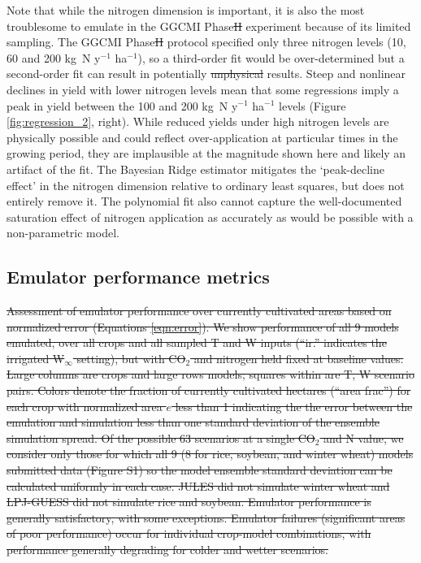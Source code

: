 \documentclass[gmdd]{copernicus} %
\providecommand{\DIFadd}[1]{{\protect\color{blue}\uwave{#1}}} %
\providecommand{\DIFdel}[1]{{\protect\color{red}\sout{#1}}}                      %
\providecommand{\DIFaddbegin}{} %
\providecommand{\DIFaddend}{} %
\providecommand{\DIFdelbegin}{} %
\providecommand{\DIFdelend}{} %
\providecommand{\DIFdelFL}[1]{\DIFdel{#1}} %
\begin{document}
Note that while the nitrogen dimension is important, it is also the most troublesome to emulate in the GGCMI Phase\DIFdelbegin \DIFdel{II }\DIFdelend \DIFaddbegin \DIFadd{~2 }\DIFaddend experiment because of its limited sampling. 
The GGCMI Phase\DIFdelbegin \DIFdel{II }\DIFdelend \DIFaddbegin \DIFadd{~2 }\DIFaddend protocol specified only three nitrogen levels (10, 60 and 200 kg~N y$^{-1}$ ha$^{-1}$), so a third-order fit would be over-determined but a second-order fit can result in potentially \DIFdelbegin \DIFdel{unphysical }\DIFdelend \DIFaddbegin \DIFadd{non-physical }\DIFaddend results. 
Steep and nonlinear declines in yield with lower nitrogen levels mean that some regressions imply a peak in yield between the 100 and 200 kg~N y$^{-1}$ ha$^{-1}$ levels (Figure \ref{fig:regression_2}, right). 
While reduced yields under high nitrogen levels are physically possible and could reflect over-application at particular times in the growing period, they are implausible at the magnitude shown here and likely an artifact of the fit. 
The Bayesian Ridge estimator mitigates the `peak-decline effect' in the nitrogen dimension relative to ordinary least squares, but does not entirely remove it. 
The polynomial fit also cannot capture the well-documented saturation effect of nitrogen application \citep[e.g.][]{Torsten77} as accurately as would be possible with a non-parametric model. 

\subsection{Emulator performance metrics}
\label{S:4.2}
\DIFdelbegin %
{%
\DIFdelFL{Assessment of emulator performance over currently cultivated areas based on normalized error (Equations \ref{eqn:error}). 
    We show performance of all 9 models emulated, over all crops and all sampled T and W inputs (``ir.'' indicates the irrigated W$_{\infty}$ setting), but with CO$_2$ and nitrogen held fixed at baseline values. 
    Large columns are crops and large rows models; squares within are T, W scenario pairs. 
    Colors denote the fraction of currently cultivated hectares (``area frac'') for each crop with normalized area $e$ less than 1 indicating the the error between the emulation and simulation less than one standard deviation of the ensemble simulation spread. 
    Of the possible 63 scenarios at a single CO$_2$ and N value, we consider only those for which all 9 (8 for rice, soybean, and winter wheat) models submitted data (Figure S1) so the model ensemble standard deviation can be calculated uniformly in each case. 
    JULES did not simulate winter wheat and LPJ-GUESS did not simulate rice and soybean. Emulator performance is generally satisfactory, with some exceptions. 
    Emulator failures (significant areas of poor performance) occur for individual crop-model combinations, with performance generally degrading for colder and wetter scenarios.
    }}
\DIFdelend 
\end{document}
